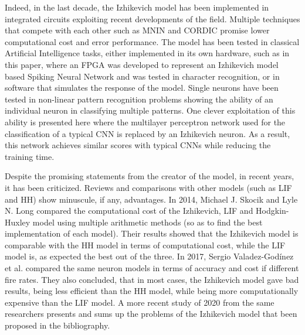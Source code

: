 \documentclass[12pt]{report}
\begin{document}
Indeed, in the last decade, the Izhikevich model has been implemented in integrated circuits exploiting recent developments of the field. Multiple techniques that compete with each other such as MNIN\cite{Haghiri2018} and CORDIC\cite{Elnabawy2018} promise lower computational cost and error performance. The model has been tested in classical Artificial Intelligence tasks, either implemented in its own hardware, such as in this paper\cite{Rice2009}, where an FPGA was developed to represent an Izhikevich model based Spiking Neural Network and was tested in character recognition, or in software that simulates the response of the model. Single neurons have been tested in non-linear pattern recognition problems\cite{Antonio2010} showing the ability of an individual neuron in classifying multiple patterns. One clever exploitation of this ability is presented here\cite{luna-a2019} where the multilayer perceptron network used for the classification of a typical CNN is replaced by an Izhikevich neuron. As a result, this network achieves similar scores with typical CNNs while reducing the training time.

Despite the promising statements from the creator of the model, in recent years, it has been criticized. Reviews and comparisons with other models (such as LIF and HH) show minuscule, if any, advantages. In 2014, Michael J. Skocik and Lyle N. Long compared the computational cost of the Izhikevich, LIF and Hodgkin-Huxley model using multiple arithmetic methods (so as to find the best implementation of each model)\cite{Skocik2014}. Their results showed that the Izhikevich model is comparable with the HH model in terms of computational cost, while the LIF model is, as expected the best out of the three. In 2017, Sergio Valadez-Godínez et al.\cite{Godinez2017} compared the same neuron models in terms of accuracy and cost if different fire rates. They also concluded, that in most cases, the Izhikevich model gave bad results, being less efficient than the HH model, while being more computationally expensive than the LIF model. A more recent study of 2020 from the same researchers\cite{Valadez-Godinez2020} presents and sums up the problems of the Izhikevich model that been proposed in the bibliography.

\medskip
\end{document}
